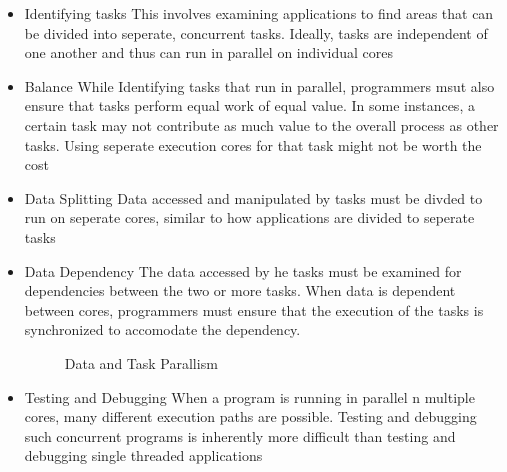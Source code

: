 \documentclass[oneside]{book}
\begin{document}
            \begin{itemize}
                \item Identifying tasks
                    \subitem This involves examining applications to find areas that can be divided into seperate, concurrent tasks. Ideally, tasks
                    are independent of one another and thus can run in parallel on individual cores
                \item Balance
                    \subitem While Identifying tasks that run in parallel, programmers msut also ensure that tasks perform equal work of equal value.
                    In some instances, a certain task may not contribute as much value to the overall process as other tasks. Using seperate execution cores
                    for that task might not be worth the cost
                \item Data Splitting
                    \subitem Data accessed and manipulated by tasks must be divded to run on seperate cores, similar to how applications are divided to seperate tasks
                \item Data Dependency
                    \subitem The data accessed by he tasks must be examined for dependencies between the two or more tasks. When data is dependent between cores,
                    programmers must ensure that the execution of the tasks is synchronized to accomodate the dependency.
                    \begin{figure}[H]
                        \centering
                        \caption{Data and Task Parallism}
                    \end{figure}
                \item Testing and Debugging
                    \subitem When a program is running in parallel n multiple cores, many different execution paths are possible. Testing and debugging such
                    concurrent programs is inherently more difficult than testing and debugging single threaded applications
            \end{itemize}
\end{document}

